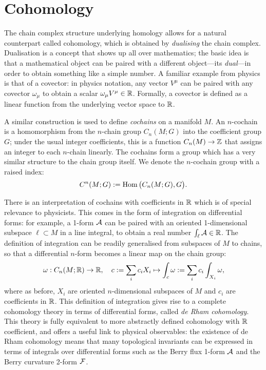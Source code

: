 \section*{Cohomology}
The chain complex structure underlying homology allows for a natural counterpart called cohomology, which is obtained by \emph{dualising} the chain complex. Dualisation is a concept that shows up all over mathematics; the basic idea is that a mathematical object can be paired with a different object---its \emph{dual}---in order to obtain something like a simple number. A familiar example from physics is that of a covector: in physics notation, any vector $V^\mu$ can be paired with any covector $\omega_\mu$ to obtain a scalar $\omega_\mu V^\mu\in\mathbb{R}$. Formally, a covector is defined as a linear function from the underlying vector space to $\mathbb{R}$.

A similar construction is used to define \emph{cochains} on a manifold $M$. An $n$-cochain is a homomorphism from the $n$-chain group $C_n(M;G)$ into the coefficient group $G$; under the usual integer coefficients, this is a function $C_n(M)\to\mathbb{Z}$ that assigns an integer to each $n$-chain linearly. The cochains form a group which has a very similar structure to the chain group itself. We denote the $n$-cochain group with a raised index:
\begin{equation*}
	C^n(M;G) := \operatorname{Hom}\big(C_n(M;G),G\big).
\end{equation*}

There is an interpretation of cochains with coefficients in $\mathbb{R}$ which is of special relevance to physicists. This comes in the form of integration on differential forms: for example, a 1-form $\mathcal{A}$ can be paired with an oriented 1-dimensional subspace $\ell\subset M$ in a line integral, to obtain a real number $\int_{\ell}\mathcal{A}\in\mathbb{R}$. The definition of integration can be readily generalised from subspaces of $M$ to chains, so that a differential $n$-form becomes a linear map on the chain group:
\begin{equation*}
	\omega: C_n(M;\mathbb{R})\to\mathbb{R},\quad c := \sum_i c_i X_i \mapsto \int_c \omega := \sum_i c_i \int_{X_i}\omega,
\end{equation*}
where as before, $X_i$ are oriented $n$-dimensional subspaces of $M$ and $c_i$ are coefficients in $\mathbb{R}$. This definition of integration gives rise to a complete cohomology theory in terms of differential forms, called \emph{de Rham cohomology}. This theory is fully equivalent to more abstractly defined cohomology with $\mathbb{R}$ coefficient, and offers a useful link to physical observables: the existence of de Rham cohomology means that many topological invariants can be expressed in terms of integrals over differential forms such as the Berry flux 1-form $\mathcal{A}$ and the Berry curvature 2-form $\mathcal{F}$.


